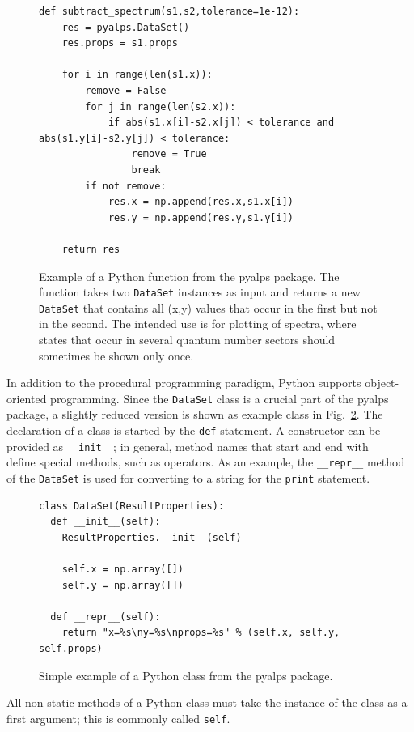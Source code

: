 \documentclass[12pt]{iopart}
\begin{document}
\begin{figure}
\begin{lstlisting}
def subtract_spectrum(s1,s2,tolerance=1e-12):
    res = pyalps.DataSet()
    res.props = s1.props

    for i in range(len(s1.x)):
        remove = False
        for j in range(len(s2.x)):
            if abs(s1.x[i]-s2.x[j]) < tolerance and abs(s1.y[i]-s2.y[j]) < tolerance:
                remove = True
                break
        if not remove:
            res.x = np.append(res.x,s1.x[i])
            res.y = np.append(res.y,s1.y[i])
    
    return res
\end{lstlisting}
\caption{Example of a Python function from the pyalps package. The function takes two {\tt DataSet} instances as input and returns a new {\tt DataSet} that contains all (x,y) values that occur in the first but not in the second. The intended use is for plotting of spectra, where states that occur in several quantum number sectors should sometimes be shown only once.}
\label{fig:Pythonfunction}
\end{figure}

In addition to the procedural programming paradigm, Python supports object-oriented programming. Since the {\tt DataSet} class is a crucial part of the pyalps package, a slightly reduced version is shown as example class in Fig.~\ref{fig:Pythonclass}. The declaration of a class is started by the {\tt def} statement. A constructor can be provided as {\tt \_\_init\_\_}; in general, method names that start and end with {\tt \_\_} define special methods, such as operators. As an example, the {\tt \_\_repr\_\_} method of the {\tt DataSet} is used for converting to a string for the {\tt print} statement.

\begin{figure}
\begin{lstlisting}
class DataSet(ResultProperties):
  def __init__(self):
    ResultProperties.__init__(self)
    
    self.x = np.array([])
    self.y = np.array([])
    
  def __repr__(self):
    return "x=%s\ny=%s\nprops=%s" % (self.x, self.y, self.props)
\end{lstlisting}
\caption{Simple example of a Python class from the pyalps package.}
\label{fig:Pythonclass}
\end{figure}
All non-static methods of a Python class must take the instance of the class as a first argument; this is commonly called {\tt self}.
\end{document}
